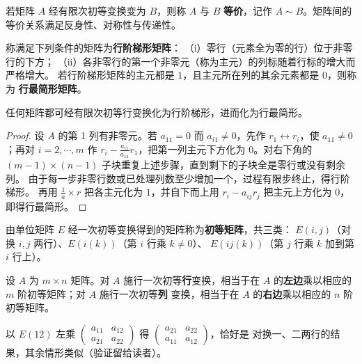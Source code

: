 若矩阵 $A$ 经有限次初等变换变为 $B$，则称 $A$ 与 $B$ \textbf{等价}，记作
$A\sim B$。矩阵间的等价关系满足反身性、对称性与传递性。

\begin{definition}\label{def:echelon}
称满足下列条件的矩阵为\textbf{行阶梯形矩阵}：
（i）零行（元素全为零的行）位于非零行的下方；
（ii）各非零行的第一个非零元（称为主元）的列标随着行标的增大而严格增大。
若行阶梯形矩阵的主元都是 $1$，且主元所在列的其余元素都是 $0$，则称为
\textbf{行最简形矩阵}。
\end{definition}

\begin{theorem}\label{thm:echelon}
任何矩阵都可经有限次初等行变换化为行阶梯形，进而化为行最简形。
\end{theorem}
\begin{proof}
设 $A$ 的第 1 列有非零元。若 $a_{11}=0$ 而 $a_{i1}\neq 0$，先作
$r_1\leftrightarrow r_i$，使 $a_{11}\neq 0$；再对 $i=2,\cdots,m$ 作
$r_i-\frac{a_{i1}}{a_{11}}r_1$，把第一列主元下方化为 $0$。对右下角的
$(m-1)\times(n-1)$ 子块重复上述步骤，直到剩下的子块全是零行或没有剩余列。
由于每一步非零行数或已处理列数至少增加一个，过程有限步终止，得行阶梯形。
再用 $\frac{1}{a}\times r$ 把各主元化为 $1$，并自下而上用
$r_i-a_{ij}r_j$ 把主元上方化为 $0$，即得行最简形。
\end{proof}

\begin{definition}\label{def:elementary-matrix}
由单位矩阵 $E$ 经一次初等变换得到的矩阵称为\textbf{初等矩阵}，共三类：
$E(i,j)$（对换 $i,j$ 两行）、$E(i(k))$（第 $i$ 行乘 $k\neq 0$）、
$E(ij(k))$（第 $j$ 行乘 $k$ 加到第 $i$ 行上）。
\end{definition}

\begin{theorem}\label{thm:elem-mult}
设 $A$ 为 $m\times n$ 矩阵。对 $A$ 施行一次初等\textbf{行}变换，相当于在
$A$ 的\textbf{左边}乘以相应的 $m$ 阶初等矩阵；对 $A$ 施行一次初等\textbf{列}
变换，相当于在 $A$ 的\textbf{右边}乘以相应的 $n$ 阶初等矩阵。
\end{theorem}

以 $E(12)$ 左乘 $\begin{pmatrix} a_{11} & a_{12} \\ a_{21} & a_{22} \end{pmatrix}$
得 $\begin{pmatrix} a_{21} & a_{22} \\ a_{11} & a_{12} \end{pmatrix}$，恰好是
对换一、二两行的结果，其余情形类似（验证留给读者）。

